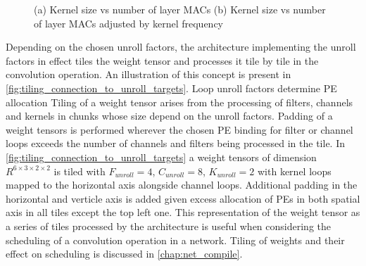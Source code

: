 \clearpage
\begin{figure}
    \centering
    \caption{(a) Kernel size vs number of layer MACs  (b) Kernel size vs number of layer MACs adjusted by kernel frequency}
    \label{fig:kernel_vs_mac}
\end{figure}

Depending on the chosen unroll factors, the architecture implementing the unroll
factors in effect tiles the weight tensor and processes it tile by tile in the
convolution operation. An
illustration of this concept is present in
\autoref{fig:tiling_connection_to_unroll_targets}. Loop unroll factors determine
PE allocation 
Tiling of a weight tensor arises from the processing of filters, channels and
kernels in chunks whose size depend on the unroll factors. 
Padding of a weight tensors is performed wherever the chosen PE
binding for filter or channel loops exceeds the number of channels and filters
being processed in the tile. In
\autoref{fig:tiling_connection_to_unroll_targets} a weight tensors of dimension
$R^{6\times 3\times 2\times 2}$ is tiled with $F_{unroll} = 4$, $C_{unroll}=8$,
$K_{unroll}=2$ with kernel loops mapped to the horizontal axis alongside channel
loops. Additional padding in the horizontal and verticle axis is added given
excess allocation of PEs in both spatial axis in all tiles except the top left
one. This representation of the weight tensor as a series of tiles processed by
the architecture is useful when considering the scheduling of a convolution
operation in a network. Tiling of weights and their effect on scheduling is
discussed in \autoref{chap:net_compile}.

